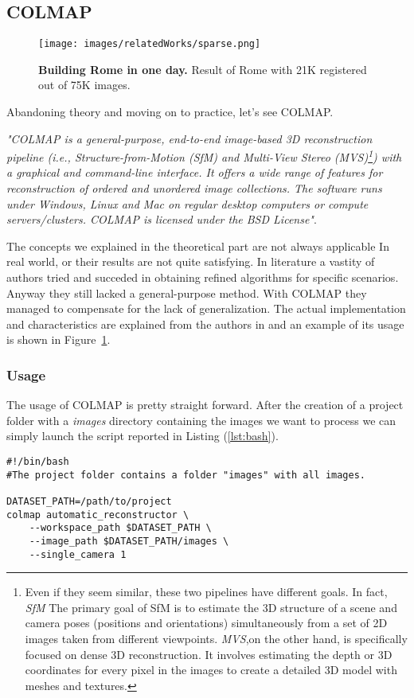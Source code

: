 \subsection{COLMAP}\label{subsec:col}
\begin{figure}
    \centering
    \texttt{[image: images/relatedWorks/sparse.png]} %
    \caption{\textbf{Building Rome in one day.} Result of Rome with 21K registered out of 75K images.}\label{fig:colmap_image}
\end{figure}
Abandoning theory and moving on to practice, let's see COLMAP.

\textit{"COLMAP is a general-purpose, end-to-end image-based 
3D reconstruction pipeline (i.e., Structure-from-Motion (SfM)
 and Multi-View Stereo (MVS)\footnote{Even if they seem similar, these
 two pipelines have different goals. In fact, \textit{SfM} The
  primary goal of SfM is to estimate the 3D structure of 
  a scene and camera poses (positions and orientations) 
  simultaneously from a set of 2D images taken from different
   viewpoints. \textit{MVS},on the other hand, is specifically focused on dense 3D reconstruction. It involves estimating the depth or 3D coordinates 
   for every pixel in the images to create a detailed 3D model with
   meshes and textures.
}) with a graphical and command-line 
 interface. It offers a wide range of features for 
 reconstruction of ordered and unordered image collections. 
 The software runs under Windows, Linux and Mac on regular
  desktop computers or compute servers/clusters. COLMAP is
   licensed under the BSD License"}\cite{colmap}.

The concepts we explained in the theoretical part are not always applicable In
real world, or their results are not quite satisfying. In literature a vastity of authors
tried and succeded in obtaining refined algorithms for specific scenarios. 
Anyway they still lacked a general-purpose method. With COLMAP they managed
to compensate for the lack of generalization. The actual implementation and characteristics
are explained from the authors in \cite{schoenberger2016sfm,schoenberger2016mvs} and an example of its usage is shown in Figure~\ref{fig:colmap_image}.

\subsubsection{Usage}
The usage of COLMAP is pretty straight forward. After the creation of a project
folder with a \textit{images} directory containing the images we want to process we 
can simply launch the script reported in Listing (\ref{lst:bash}).
\begin{lstlisting}[style=vscode, caption={Automatic COLMAP Reconstruction}, label={lst:bash}]
#!/bin/bash
#The project folder contains a folder "images" with all images.

DATASET_PATH=/path/to/project
colmap automatic_reconstructor \
    --workspace_path $DATASET_PATH \
    --image_path $DATASET_PATH/images \
    --single_camera 1
    \end{lstlisting}

